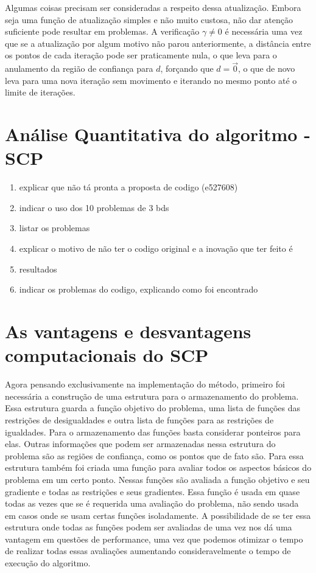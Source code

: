 Algumas coisas precisam ser consideradas a respeito dessa atualização. Embora seja
uma função de atualização simples e não muito custosa, não dar atenção suficiente
pode resultar em problemas. A verificação \(\gamma \ne 0\) é necessária uma vez que
se a atualização por algum motivo não parou anteriormente, a distância entre os
pontos de cada iteração pode ser praticamente nula, o que leva para o anulamento
da região de confiança para \(d\), forçando que \(d = \overrightarrow 0\), o que
de novo leva para uma nova iteração sem movimento e iterando no mesmo ponto até
o limite de iterações.


\section{Análise Quantitativa do algoritmo - SCP}

\begin{enumerate}
\item explicar que não tá pronta a proposta de codigo (e527608)
\item indicar o uso dos 10 problemas de 3 bds
\item listar os problemas
\item explicar o motivo de não ter o codigo original e a inovação que ter feito é
\item resultados
\item indicar os problemas do codigo, explicando como foi encontrado
\end{enumerate}



\section{As vantagens e desvantagens computacionais do SCP}

Agora pensando exclusivamente na implementação do método, primeiro foi necessária
a construção de uma estrutura para o armazenamento do problema. Essa estrutura guarda
a função objetivo do problema, uma lista de funções das restrições de desigualdades e
outra lista de funções para as restrições de igualdades. Para o armazenamento das
funções basta considerar ponteiros para elas. Outras informações que podem ser
armazenadas nessa estrutura do problema são as regiões de confiança, como os
pontos que de fato são. Para essa estrutura também foi criada uma função
para avaliar todos os aspectos básicos do problema em um certo ponto. Nessas
funções são avaliada a função objetivo e seu gradiente e todas as restrições e seus
gradientes. Essa função é usada em quase todas as vezes que se é requerida uma avaliação
do problema, não sendo usada em casos onde se usam certas funções isoladamente. A
possibilidade de se ter essa estrutura onde todas as funções podem ser avaliadas de uma vez
nos dá uma vantagem em questões de performance, uma vez que podemos otimizar o tempo de
realizar todas essas avaliações aumentando consideravelmente o tempo de execução do algoritmo.

